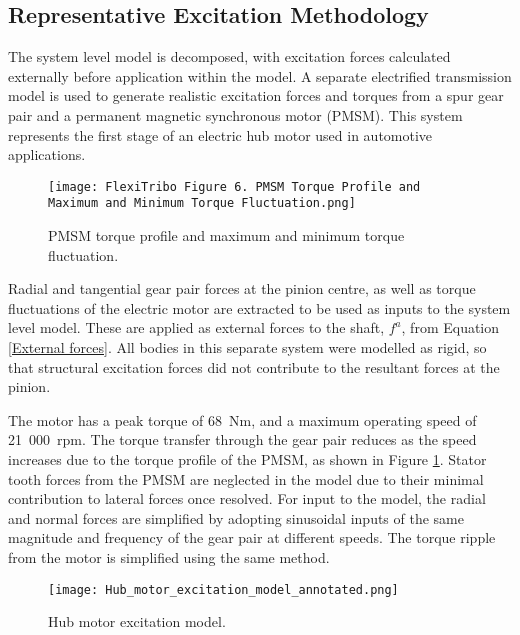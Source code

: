 \subsection{Representative Excitation Methodology}

The system level model is decomposed, with excitation forces calculated externally before application within the model. A separate electrified transmission model is used to generate realistic excitation forces and torques from a spur gear pair and a permanent magnetic synchronous motor (PMSM). This system represents the first stage of an electric hub motor used in automotive applications.

\begin{figure}
	\centering  
	\texttt{[image: FlexiTribo Figure 6. PMSM Torque Profile and Maximum and Minimum Torque Fluctuation.png]}
	\caption{PMSM torque profile and maximum and minimum torque fluctuation.}
	\label{PMSM torque profile}
\end{figure} 

Radial and tangential gear pair forces at the pinion centre, as well as torque fluctuations of the electric motor are extracted to be used as inputs to the system level model. These are applied as external forces to the shaft, $f^a$, from Equation \ref{External forces}. All bodies in this separate system were modelled as rigid, so that structural excitation forces did not contribute to the resultant forces at the pinion.

The motor has a peak torque of 68~$\mathrm{Nm}$, and a maximum operating speed of 21~000~$\mathrm{rpm}$. The torque transfer through the gear pair reduces as the speed increases due to the torque profile of the PMSM, as shown in Figure \ref{PMSM torque profile}. Stator tooth forces from the PMSM are neglected in the model due to their minimal contribution to lateral forces once resolved. For input to the model, the radial and normal forces are simplified by adopting sinusoidal inputs of the same magnitude and frequency of the gear pair at different speeds. The torque ripple from the motor is simplified using the same method.

\begin{figure}
	\centering  
	\texttt{[image: Hub\_motor\_excitation\_model\_annotated.png]}
	\caption{Hub motor excitation model.}
	\label{Hub_motor_excitation_model}
\end{figure} 

